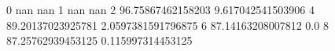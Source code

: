 0 nan nan
1 nan nan
2 96.75867462158203 9.617042541503906
4 89.20137023925781 2.0597381591796875
6 87.14163208007812 0.0
8 87.25762939453125 0.115997314453125
